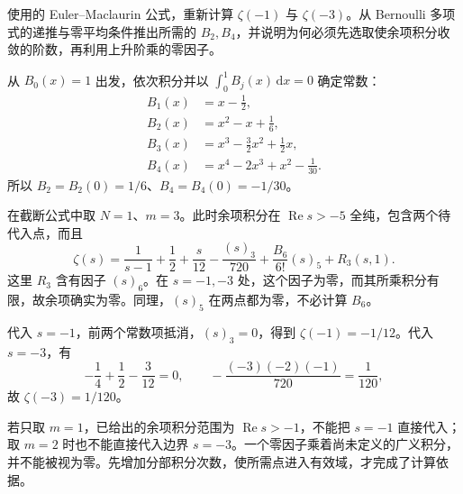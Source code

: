 \begin{optionalexercise}\label{b3:ex:26-7}
使用的 Euler–Maclaurin 公式，重新计算
\(\zeta(-1)\) 与 \(\zeta(-3)\)。从 Bernoulli 多项式的递推与零平均条件推出所需的 \(B_2,B_4\)，并说明为何必须先选取使余项积分收敛的阶数，再利用上升阶乘的零因子。
\end{optionalexercise}
\begin{solution}
从 \(B_0(x)=1\) 出发，依次积分并以 \(\int_0^1B_j(x)\,\mathrm dx=0\) 确定常数：
\[
 \begin{aligned}
 B_1(x)&=x-\tfrac12,\\
 B_2(x)&=x^2-x+\tfrac16,\\
 B_3(x)&=x^3-\tfrac32x^2+\tfrac12x,\\
 B_4(x)&=x^4-2x^3+x^2-\tfrac1{30}.
 \end{aligned}
\]
所以 \(B_2=B_2(0)=1/6\)、\(B_4=B_4(0)=-1/30\)。

在截断公式中取 \(N=1\)、\(m=3\)。此时余项积分在 \(\operatorname{Re}s>-5\) 全纯，包含两个待代入点，而且
\[
 \zeta(s)=\frac1{s-1}+\frac12+\frac{s}{12}
       -\frac{(s)_3}{720}+\frac{B_6}{6!}(s)_5+R_3(s,1).
\]
这里 \(R_3\) 含有因子 \((s)_6\)。在 \(s=-1,-3\) 处，这个因子为零，而其所乘积分有限，故余项确实为零。同理，\((s)_5\) 在两点都为零，不必计算 \(B_6\)。

代入 \(s=-1\)，前两个常数项抵消，\((s)_3=0\)，得到 \(\zeta(-1)=-1/12\)。代入 \(s=-3\)，有
\[
 -\frac14+\frac12-\frac3{12}=0,\qquad
 -\frac{(-3)(-2)(-1)}{720}=\frac1{120},
\]
故 \(\zeta(-3)=1/120\)。

若只取 \(m=1\)，已给出的余项积分范围为 \(\operatorname{Re}s>-1\)，不能把 \(s=-1\) 直接代入；取 \(m=2\) 时也不能直接代入边界 \(s=-3\)。一个零因子乘着尚未定义的广义积分，并不能被视为零。先增加分部积分次数，使所需点进入有效域，才完成了计算依据。
\end{solution}

